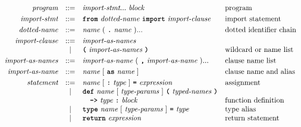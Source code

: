 \[\begin{array}{rcll}

\textit{program}            & ::= & \textit{import-stmt} ... \ \textit{block}                                                & \text{program}                          \\[1mm]
\textit{import-stmt}        & ::= & \term{from}\ \textit{dotted-name}\ \term{import}\ \textit{import-clause}                 & \text{import statement}                 \\[1mm]
\textit{dotted-name}        & ::= & \textit{name}\ (\ \term{.}\ \textit{name}\ )...                                          & \text{dotted identifier chain}          \\[1mm]
\textit{import-clause}      & ::= & \textit{import-as-names}                                                                 &                                         \\
                            & |   & \term{(}\ \textit{import-as-names}\ \term{)}                                             & \text{wildcard or name list}            \\[1mm]
\textit{import-as-names}    & ::= & \textit{import-as-name}\ (\ \term{,}\ \textit{import-as-name}\ )...                      & \text{clause name list}                 \\[1mm]
\textit{import-as-name}     & ::= & \textit{name}\ [\ \term{as}\ \textit{name}\ ]                                            & \text{clause name and alias}            \\[1mm]
\textit{statement}          & ::= & \textit{name}\ [\ \term{:}\ \textit{type}\ ]\ \term{=}\ \textit{expression}             & \text{assignment}             \\
                            & |   & \term{def}\ \textit{name}\ [\ \textit{type-params}\ ]
                                    \ \term{(}\ \textit{typed-names}\ \term{)}                                               &                                         \\
                            &     & \hm\term{->}\ \textit{type}\ \term{:}\ \textit{block}                                    & \text{function definition}             \\
                            & |   & \term{type}\ \textit{name}\ [\ \textit{type-params}\ ]\ \term{=}\ \textit{type}          & \text{type alias}                       \\
                            & |   & \term{return}\ \textit{expression}                                                       & \text{return statement}                 \\

\end{array}\]
